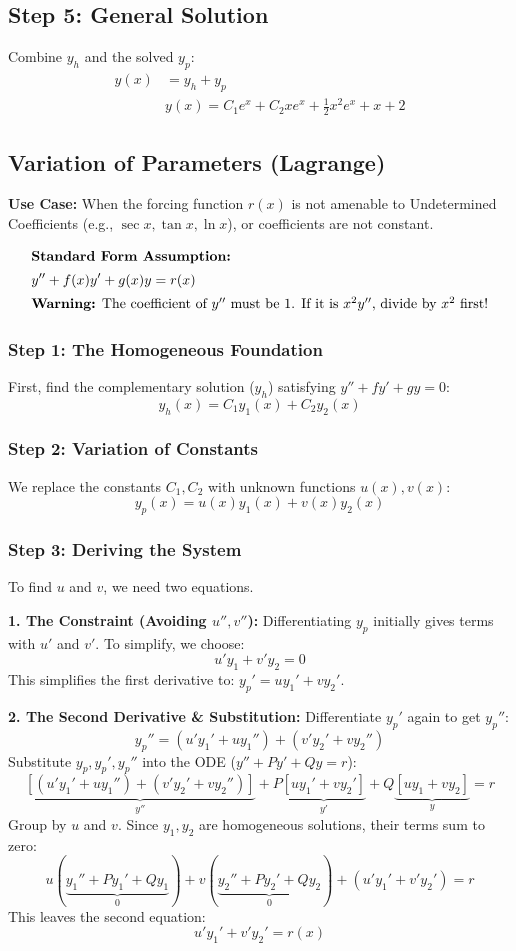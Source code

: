 \documentclass[11pt]{article}
\begin{document}
\subsection*{Step 5: General Solution}
Combine $y_h$ and the solved $y_p$:
\begin{align*}
    y(x) &= y_h + y_p \\
   &\boxed{y(x) = C_1 e^x + C_2 x e^x + \frac{1}{2}x^2 e^x + x + 2}
\end{align*}
\subsection{Variation of Parameters (Lagrange)}
\textbf{Use Case:} When the forcing function $r(x)$ is not amenable to Undetermined Coefficients (e.g., $\sec x, \tan x, \ln x$), or coefficients are not constant.

\begin{align*}
    \intertext{\textbf{Standard Form Assumption:}}
    y'' + f(x)y' + g(x)y &= r(x) \\
    \intertext{\textbf{Warning:} The coefficient of $y''$ must be 1. If it is $x^2y''$, divide by $x^2$ first!}
\end{align*}

\subsubsection*{Step 1: The Homogeneous Foundation}
First, find the complementary solution ($y_h$) satisfying $y''+fy'+gy=0$:
\[ y_h(x) = C_1 y_1(x) + C_2 y_2(x) \]

\subsubsection*{Step 2: Variation of Constants}
We replace the constants $C_1, C_2$ with unknown functions $u(x), v(x)$:
\[ y_p(x) = u(x)y_1(x) + v(x)y_2(x) \]

\subsubsection*{Step 3: Deriving the System}
To find $u$ and $v$, we need two equations.

\textbf{1. The Constraint (Avoiding $u'', v''$):}
Differentiating $y_p$ initially gives terms with $u'$ and $v'$. To simplify, we choose:
\[ \boxed{u'y_1 + v'y_2 = 0} \]
This simplifies the first derivative to: $y_p' = u y_1' + v y_2'$.

\textbf{2. The Second Derivative \& Substitution:}
Differentiate $y_p'$ again to get $y_p''$:
\[ y_p'' = (u'y_1' + u y_1'') + (v'y_2' + v y_2'') \]
Substitute $y_p, y_p', y_p''$ into the ODE ($y'' + Py' + Qy = r$):
\[
    \underbrace{[(u'y_1' + u y_1'') + (v'y_2' + v y_2'')]}_{y''} + P\underbrace{[u y_1' + v y_2']}_{y'} + Q\underbrace{[u y_1 + v y_2]}_{y} = r
\]
Group by $u$ and $v$. Since $y_1, y_2$ are homogeneous solutions, their terms sum to zero:
\[
    u(\underbrace{y_1'' + Py_1' + Qy_1}_{0}) + v(\underbrace{y_2'' + Py_2' + Qy_2}_{0}) + (u'y_1' + v'y_2') = r
\]
This leaves the second equation:
\[ \boxed{u'y_1' + v'y_2' = r(x)} \]
\end{document}
